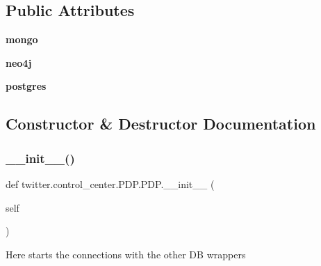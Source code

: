 \subsection*{Public Attributes}
\begin{DoxyCompactItemize}
\item 
\mbox{\label{classtwitter_1_1control__center_1_1PDP_1_1PDP_ac625eb8534bd8073613e9cccb21f1999}} 
{\bfseries mongo}
\item 
\mbox{\label{classtwitter_1_1control__center_1_1PDP_1_1PDP_aba6c617ea663cbe89a36c4a879f0dda1}} 
{\bfseries neo4j}
\item 
\mbox{\label{classtwitter_1_1control__center_1_1PDP_1_1PDP_afa535f42bb7f0e2e73f7acae08723756}} 
{\bfseries postgres}
\end{DoxyCompactItemize}


\subsection{Constructor \& Destructor Documentation}
\mbox{\label{classtwitter_1_1control__center_1_1PDP_1_1PDP_adf406e4b2ad47c65c563ccc7eccaf871}} 
\subsubsection{\texorpdfstring{\+\_\+\+\_\+init\+\_\+\+\_\+()}{\_\_init\_\_()}}
{\footnotesize\ttfamily def twitter.\+control\+\_\+center.\+P\+D\+P.\+P\+D\+P.\+\_\+\+\_\+init\+\_\+\+\_\+ (\begin{DoxyParamCaption}\item[{}]{self }\end{DoxyParamCaption})}

\begin{DoxyVerb}Here starts the connections with the other DB wrappers
\end{DoxyVerb}
 

